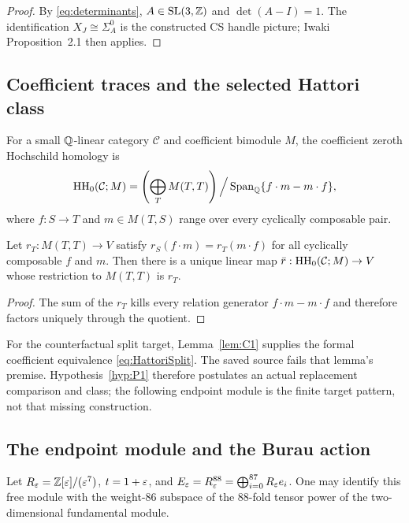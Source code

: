\begin{proof}
By \eqref{eq:determinants}, $A\in\mathrm{SL}(3,\mathbb{Z})$ and $\det(A-I)=1$.
The identification $X_J\cong\Sigma_A^0$ is the constructed CS handle picture;
Iwaki Proposition~2.1 \cite{Iwaki2024} then applies.
\end{proof}

\subsection{Coefficient traces and the selected Hattori class}

\begin{definition}\label{def:coefficient-HH0}
For a small $\mathbb{Q}$-linear category $\mathcal C$ and coefficient bimodule $M$,
the coefficient zeroth Hochschild homology is
\[
\operatorname{HH}_{0}(\mathcal C;M)=
\left(\bigoplus_{T}M(T,T)\right)
\Big/
\operatorname{Span}_{\mathbb{Q}}\{f\cdot m-m\cdot f\},
\]
where $f:S\to T$ and $m\in M(T,S)$ range over every cyclically composable
pair.
\end{definition}

\begin{lemma}\label{lem:HH0-descent}
Let $r_T:M(T,T)\to V$ satisfy $r_S(f\cdot m)=r_T(m\cdot f)$ for all
cyclically composable $f$ and $m$.  Then there is a unique linear map
$\bar r:\operatorname{HH}_{0}(\mathcal C;M)\to V$ whose restriction to $M(T,T)$ is $r_T$.
\end{lemma}

\begin{proof}
The sum of the $r_T$ kills every relation generator $f\cdot m-m\cdot f$ and
therefore factors uniquely through the quotient.
\end{proof}

For the counterfactual split target, Lemma~\ref{lem:C1} supplies the formal
coefficient equivalence \eqref{eq:HattoriSplit}.  The saved source fails that
lemma's premise.  Hypothesis~\ref{hyp:P1} therefore postulates an actual
replacement comparison and class; the following endpoint module is the
finite target pattern, not that missing construction.

\subsection{The endpoint module and the Burau action}

\begin{definition}\label{def:endpoint-module}
Let $R_\varepsilon=\mathbb{Z}[\varepsilon]/(\varepsilon^7)$, $t=1+\varepsilon$, and
$E_\varepsilon=R_\varepsilon^{88}=\bigoplus_{i=0}^{87}R_\varepsilon e_i$.  One may identify this
free module with the weight-$86$ subspace of the $88$-fold tensor power of
the two-dimensional fundamental module.
\end{definition}

